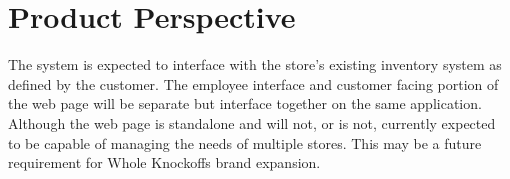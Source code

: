 \documentclass{scrreprt}
\theoremstyle{funreq}
\begin{document}
\section{Product Perspective}
The system is expected to interface with the store's existing inventory system as defined by the customer. The employee interface and customer facing portion of the web page will be separate but interface together on the same application. Although the web page is standalone and will not, or is not, currently expected to be capable of managing the needs of multiple stores. This may be a future requirement for Whole Knockoffs brand expansion. %
\end{document}
